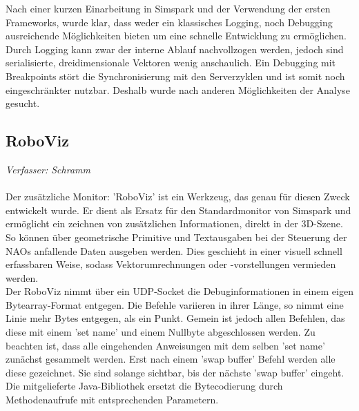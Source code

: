 Nach einer kurzen Einarbeitung in Simspark und der Verwendung der ersten Frameworks, wurde klar, dass weder ein klassisches Logging, noch Debugging ausreichende Möglichkeiten bieten um eine schnelle Entwicklung zu ermöglichen. Durch Logging kann zwar der interne Ablauf nachvollzogen werden, jedoch sind serialisierte, dreidimensionale Vektoren wenig anschaulich.
Ein Debugging mit Breakpoints stört die Synchronisierung mit den Serverzyklen und ist somit noch eingeschränkter nutzbar. Deshalb wurde nach anderen Möglichkeiten der Analyse gesucht.

\subsection{RoboViz}
\label{subsec:RoboViz}
\textit{Verfasser: Schramm}\\
\\
Der zusätzliche Monitor: 'RoboViz' ist ein Werkzeug, das genau für diesen Zweck entwickelt wurde. Er dient als Ersatz für den Standardmonitor von Simspark und ermöglicht ein zeichnen von zusätzlichen Informationen, direkt in der 3D-Szene. So können über geometrische Primitive und Textausgaben bei der Steuerung der NAOs anfallende Daten ausgeben werden. Dies geschieht in einer visuell schnell erfassbaren Weise, sodass Vektorumrechnungen oder -vorstellungen vermieden werden.\\

Der RoboViz nimmt über ein UDP-Socket die Debuginformationen in einem eigen Bytearray-Format entgegen. Die Befehle variieren in ihrer Länge, so nimmt eine Linie mehr Bytes entgegen, als ein Punkt. Gemein ist jedoch allen Befehlen, das diese mit einem 'set name' und einem Nullbyte abgeschlossen werden. Zu beachten ist, dass alle eingehenden Anweisungen mit dem selben 'set name' zunächst gesammelt werden. Erst nach einem 'swap buffer' Befehl werden alle diese gezeichnet. Sie sind solange sichtbar, bis der nächste 'swap buffer' eingeht.\\
Die mitgelieferte Java-Bibliothek ersetzt die Bytecodierung durch Methodenaufrufe mit entsprechenden Parametern.

